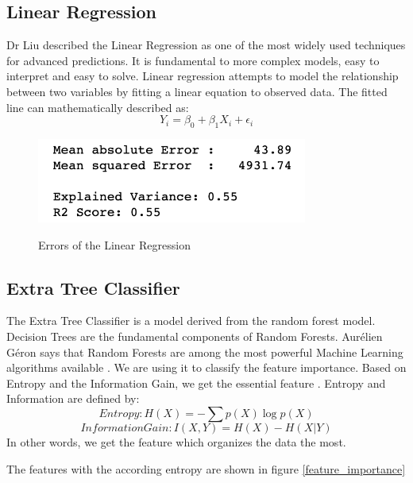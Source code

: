 \documentclass[journal]{IEEEtran}
\begin{document}
\subsection{Linear Regression}
\noindent Dr Liu described the Linear Regression as one of the most widely used techniques for advanced predictions. It is fundamental to more complex models, easy to interpret and easy to solve. \cite{RN7}
Linear regression attempts to model the relationship between two variables by fitting a linear equation to observed data.
The fitted line can mathematically described as:
\begin{equation}
Y_i = \beta_0 + \beta_1 X_i + \epsilon_i
\end{equation}

\begin{figure}
  \begin{center}
  \includegraphics[width=3.5in]{photo/linear_regression.png}\\
  \caption{Errors of the Linear Regression}\label{linear_regression}
  \end{center}
\end{figure}

\subsection{Extra Tree Classifier }
\noindent The Extra Tree Classifier is a model derived from the random forest model. Decision Trees are the fundamental components of Random Forests.  Aurélien Géron says that Random Forests are among the most powerful Machine Learning algorithms available \cite{ho} . We are using it to classify the feature importance. Based on Entropy and the Information Gain, we get the essential feature\cite{Bishop} \cite{decisionforests}. Entropy and Information are defined by: 
\begin{equation}
Entropy: H(X) = -\sum p(X)\log p(X) 
\end{equation}
\begin{equation}
Information Gain: I(X,Y)= H(X)-H(X|Y)
\end{equation}
In other words, we get the feature which organizes the data the most. 

The features with the according entropy are shown in figure \ref{feature_importance}
\end{document}
